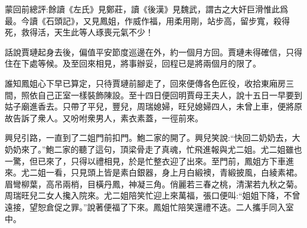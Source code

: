 

\begin{parag}
    \begin{note}蒙回前總評:餘讀《左氏》見鄭莊，讀《後漢》見魏武，謂古之大奸巨滑惟此爲最。今讀《石頭記》，又見鳳姐，作威作福，用柔用剛，站步高，留步寬，殺得死，救得活，天生此等人琢喪元氣不少！\end{note}
\end{parag}


\begin{parag}
    話說賈璉起身去後，偏值平安節度巡邊在外，約一個月方回。賈璉未得確信，只得住在下處等候。及至回來相見，將事辦妥，回程已是將兩個月的限了。
\end{parag}


\begin{parag}
    誰知鳳姐心下早已算定，只待賈璉前腳走了，回來便傳各色匠役，收拾東廂房三間，照依自己正室一樣裝飾陳設。至十四日便回明賈母王夫人，說十五日一早要到姑子廟進香去。只帶了平兒，豐兒，周瑞媳婦，旺兒媳婦四人，未曾上車，便將原故告訴了衆人。又吩咐衆男人，素衣素蓋，一徑前來。
\end{parag}


\begin{parag}
    興兒引路，一直到了二姐門前扣門。鮑二家的開了。興兒笑說:“快回二奶奶去，大奶奶來了。”鮑二家的聽了這句，頂梁骨走了真魂，忙飛進報與尤二姐。尤二姐雖也一驚，但已來了，只得以禮相見，於是忙整衣迎了出來。至門前，鳳姐方下車進來。尤二姐一看，只見頭上皆是素白銀器，身上月白緞襖，青緞披風，白綾素裙。眉彎柳葉，高吊兩梢，目橫丹鳳，神凝三角。俏麗若三春之桃，清潔若九秋之菊。周瑞旺兒二女人攙入院來。尤二姐陪笑忙迎上來萬福，張口便叫:“姐姐下降，不曾遠接，望恕倉促之罪。”說著便福了下來。鳳姐忙陪笑還禮不迭。二人攜手同入室中。
\end{parag}


